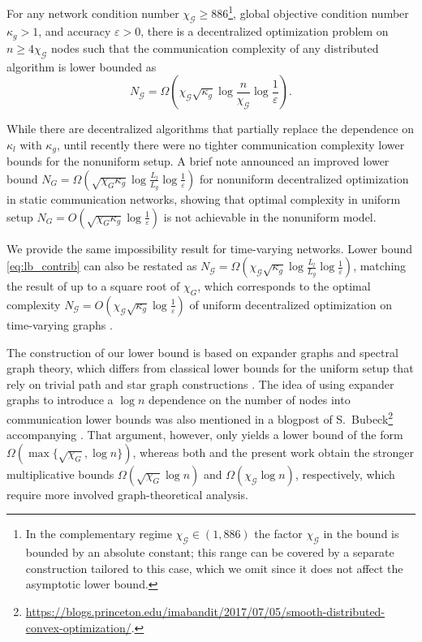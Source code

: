 \documentclass[a4paper,USenglish,cleveref, autoref, thm-restate]{lipics-v2021}
\newcommand{\eps}{\varepsilon}
\newcommand{\cG}{{\mathcal G}}
\begin{document}
\begin{theorem}\label{thm:main}
For any network condition number $\chi_\cG \geq 886$\footnote{In the complementary regime $\chi_\cG \in (1, 886)$ the factor $\chi_\cG$ in the bound is bounded by an absolute constant; this range can be covered by a separate construction tailored to this case, which we omit since it does not affect the asymptotic lower bound.}, global objective condition number $\kappa_g > 1$, and accuracy $\eps > 0$, there is a decentralized optimization problem on $n \geq 4\chi_\cG$ nodes such that the communication complexity of any distributed algorithm is lower bounded as
\begin{equation}\label{eq:lb_contrib}
   N_\cG = \Omega \left( \chi_\cG \sqrt{\kappa_g} \log \frac{n}{\chi_\cG} \log \frac{1}{\eps}\right).
 \end{equation} 
\end{theorem}

While there are decentralized algorithms that partially replace the dependence on $\kappa_l$ with $\kappa_g$, until recently there were no tighter communication complexity lower bounds for the nonuniform setup. 
A brief note \cite{KovKupRog26} announced an improved lower bound 
$N_G = \Omega \left( \sqrt{\chi_G \kappa_g} \log \frac{L_l}{L_g} \log \frac{1}{\eps}\right)$
for nonuniform decentralized optimization in static communication networks, showing that optimal complexity in uniform setup
$N_G = O \left( \sqrt{\chi_G \kappa_g} \log \frac{1}{\eps}\right)$ \cite{scaman2017optimal}
is not achievable in the nonuniform model.

We provide the same impossibility result for time-varying networks. 
Lower bound \eqref{eq:lb_contrib} can also be restated %
as $N_\cG = \Omega \left( \chi_\cG \sqrt {\kappa_g} \log \frac{L_l}{L_g} \log \frac{1}{\eps}\right)$,
matching the result of \cite{KovKupRog26} up to a square root of $\chi_G$, which corresponds to the optimal complexity
$N_\cG = O \left( \chi_\cG \sqrt {\kappa_g} \log \frac{1}{\eps}\right)$ of uniform decentralized optimization on time-varying graphs \cite{kovalev2021lower}.

The construction of our lower bound is based on expander graphs and spectral graph theory, which differs from classical lower bounds for the uniform setup that rely on trivial path and star graph constructions \cite{scaman2017optimal,kovalev2021lower,scaman2019optimal}.
The idea of using expander graphs to introduce a $\log n$ dependence on the number of nodes into communication lower bounds was also mentioned in a blogpost of S.~Bubeck\footnote{\url{https://blogs.princeton.edu/imabandit/2017/07/05/smooth-distributed-convex-optimization/}.} accompanying \cite{scaman2017optimal}.
That argument, however, only yields a lower bound of the form $\Omega(\max\{\sqrt{\chi_G}, \log n\})$, whereas both \cite{KovKupRog26} and the present work obtain the stronger multiplicative bounds $\Omega(\sqrt{\chi_G}\log n)$ and $\Omega(\chi_\cG \log n)$, respectively, which require more involved graph-theoretical analysis. %
\end{document}
